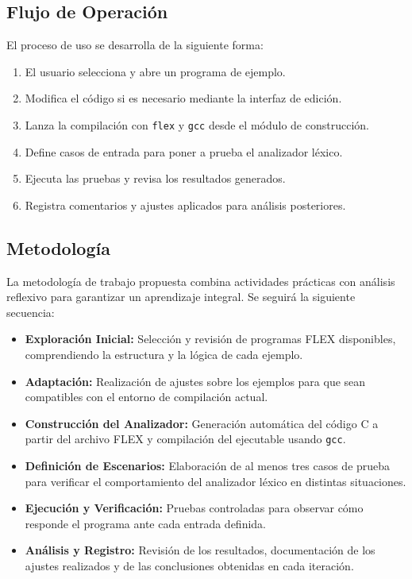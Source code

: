 \documentclass{article}
\begin{document}
\subsection*{Flujo de Operación}

El proceso de uso se desarrolla de la siguiente forma:
\begin{enumerate}
    \item El usuario selecciona y abre un programa de ejemplo.
    \item Modifica el código si es necesario mediante la interfaz de edición.
    \item Lanza la compilación con \texttt{flex} y \texttt{gcc} desde el módulo de construcción.
    \item Define casos de entrada para poner a prueba el analizador léxico.
    \item Ejecuta las pruebas y revisa los resultados generados.
    \item Registra comentarios y ajustes aplicados para análisis posteriores.
\end{enumerate}


\subsection{Metodología}

La metodología de trabajo propuesta combina actividades prácticas con análisis reflexivo para garantizar un aprendizaje integral. Se seguirá la siguiente secuencia:

\begin{itemize}
    \item \textbf{Exploración Inicial:} Selección y revisión de programas FLEX disponibles, comprendiendo la estructura y la lógica de cada ejemplo.
    \item \textbf{Adaptación:} Realización de ajustes sobre los ejemplos para que sean compatibles con el entorno de compilación actual.
    \item \textbf{Construcción del Analizador:} Generación automática del código C a partir del archivo FLEX y compilación del ejecutable usando \texttt{gcc}.
    \item \textbf{Definición de Escenarios:} Elaboración de al menos tres casos de prueba para verificar el comportamiento del analizador léxico en distintas situaciones.
    \item \textbf{Ejecución y Verificación:} Pruebas controladas para observar cómo responde el programa ante cada entrada definida.
    \item \textbf{Análisis y Registro:} Revisión de los resultados, documentación de los ajustes realizados y de las conclusiones obtenidas en cada iteración.
\end{itemize}
\end{document}
